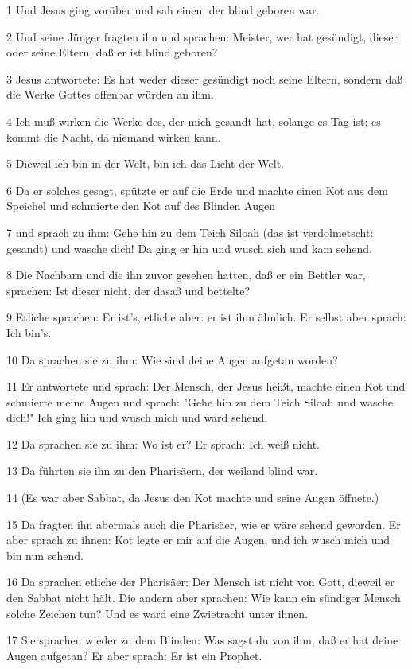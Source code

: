 \par 1 Und Jesus ging vorüber und sah einen, der blind geboren war.
\par 2 Und seine Jünger fragten ihn und sprachen: Meister, wer hat gesündigt, dieser oder seine Eltern, daß er ist blind geboren?
\par 3 Jesus antwortete: Es hat weder dieser gesündigt noch seine Eltern, sondern daß die Werke Gottes offenbar würden an ihm.
\par 4 Ich muß wirken die Werke des, der mich gesandt hat, solange es Tag ist; es kommt die Nacht, da niemand wirken kann.
\par 5 Dieweil ich bin in der Welt, bin ich das Licht der Welt.
\par 6 Da er solches gesagt, spützte er auf die Erde und machte einen Kot aus dem Speichel und schmierte den Kot auf des Blinden Augen
\par 7 und sprach zu ihm: Gehe hin zu dem Teich Siloah (das ist verdolmetscht: gesandt) und wasche dich! Da ging er hin und wusch sich und kam sehend.
\par 8 Die Nachbarn und die ihn zuvor gesehen hatten, daß er ein Bettler war, sprachen: Ist dieser nicht, der dasaß und bettelte?
\par 9 Etliche sprachen: Er ist's, etliche aber: er ist ihm ähnlich. Er selbst aber sprach: Ich bin's.
\par 10 Da sprachen sie zu ihm: Wie sind deine Augen aufgetan worden?
\par 11 Er antwortete und sprach: Der Mensch, der Jesus heißt, machte einen Kot und schmierte meine Augen und sprach: "Gehe hin zu dem Teich Siloah und wasche dich!" Ich ging hin und wusch mich und ward sehend.
\par 12 Da sprachen sie zu ihm: Wo ist er? Er sprach: Ich weiß nicht.
\par 13 Da führten sie ihn zu den Pharisäern, der weiland blind war.
\par 14 (Es war aber Sabbat, da Jesus den Kot machte und seine Augen öffnete.)
\par 15 Da fragten ihn abermals auch die Pharisäer, wie er wäre sehend geworden. Er aber sprach zu ihnen: Kot legte er mir auf die Augen, und ich wusch mich und bin nun sehend.
\par 16 Da sprachen etliche der Pharisäer: Der Mensch ist nicht von Gott, dieweil er den Sabbat nicht hält. Die andern aber sprachen: Wie kann ein sündiger Mensch solche Zeichen tun? Und es ward eine Zwietracht unter ihnen.
\par 17 Sie sprachen wieder zu dem Blinden: Was sagst du von ihm, daß er hat deine Augen aufgetan? Er aber sprach: Er ist ein Prophet.

